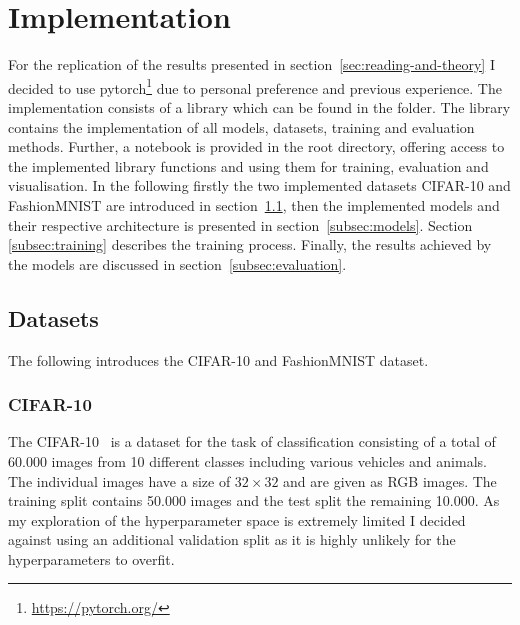 \section{Implementation}\label{sec:implementation}
For the replication of the results presented in section~\ref{sec:reading-and-theory} I decided to use pytorch\footnote[1]{\href{https://pytorch.org/}{https://pytorch.org/}} due to personal preference and previous experience.
The implementation consists of a library which can be found in the  folder.
The library contains the implementation of all models, datasets, training and evaluation methods.
Further, a notebook is provided in the root directory, offering access to the implemented library functions and using them for training, evaluation and visualisation.
In the following firstly the two implemented datasets CIFAR-10 and FashionMNIST are introduced in section~\ref{subsec:datasets}, then the implemented models and their respective architecture is presented in section~\ref{subsec:models}.
Section \ref{subsec:training} describes the training process.
Finally, the results achieved by the models are discussed in section~\ref{subsec:evaluation}.

\subsection{Datasets}\label{subsec:datasets}
The following introduces the CIFAR-10 and FashionMNIST dataset.

\subsubsection{CIFAR-10}
The CIFAR-10~\cite{CIFAR10} is a dataset for the task of classification consisting of a total of 60.000 images from 10 different classes including various vehicles and animals.
The individual images have a size of $32\times 32$ and are given as RGB images.
The training split contains 50.000 images and the test split the remaining 10.000.
As my exploration of the hyperparameter space is extremely limited I decided against using an additional validation split as it is highly unlikely for the hyperparameters to overfit.

